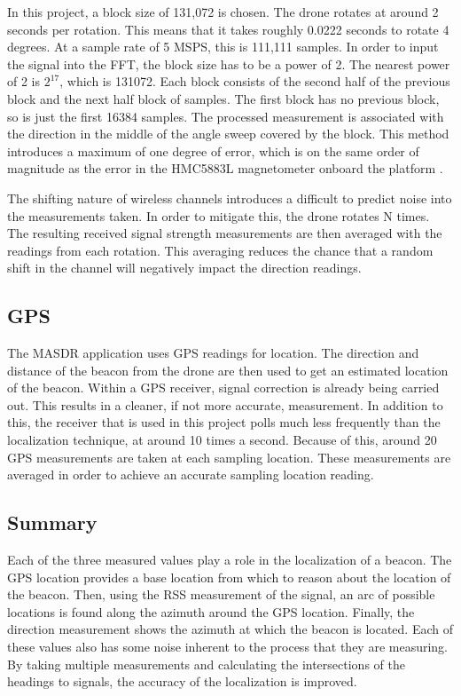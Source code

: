 In this project, a block size of 131,072 is chosen. The drone rotates at around 2 seconds per rotation. This means that it takes roughly 0.0222 seconds to rotate 4 degrees. At a sample rate of 5 MSPS, this is 111,111 samples. In order to input the signal into the FFT, the block size has to be a power of 2. The nearest power of 2 is $2^{17}$, which is 131072. Each block consists of the second half of the previous block and the next half block of samples. The first block has no previous block, so is just the first 16384 samples. The processed measurement is associated with the direction in the middle of the angle sweep covered by the block. This method introduces a maximum of one degree of error, which is on the same order of magnitude as the error in the HMC5883L magnetometer onboard the platform \cite{magnetometer_data}. \par 
The shifting nature of wireless channels introduces a difficult to predict noise into the measurements taken. In order to mitigate this, the drone rotates N times. The resulting received signal strength measurements are then averaged with the readings from each rotation. This averaging reduces the chance that a random shift in the channel will negatively impact the direction readings. \par 

\subsection{GPS}
The MASDR application uses GPS readings for location. The direction and distance of the beacon from the drone are then used to get an estimated location of the beacon. 
Within a GPS receiver, signal correction is already being carried out. This results in a cleaner, if not more accurate, measurement. In addition to this, the receiver that is used in this project polls much less frequently than the localization technique, at around 10 times a second. Because of this, around 20 GPS measurements are taken at each sampling location. These measurements are averaged in order to achieve an accurate sampling location reading.\par
 
\subsection{Summary}
Each of the three measured values play a role in the localization of a beacon. The GPS location provides a base location from which to reason about the location of the beacon. Then, using the RSS measurement of the signal, an arc of possible locations is found along the azimuth around the GPS location. Finally, the direction measurement shows the azimuth at which the beacon is located. Each of these values also has some noise inherent to the process that they are measuring. By taking multiple measurements and calculating the intersections of the headings to signals, the accuracy of the localization is improved.


